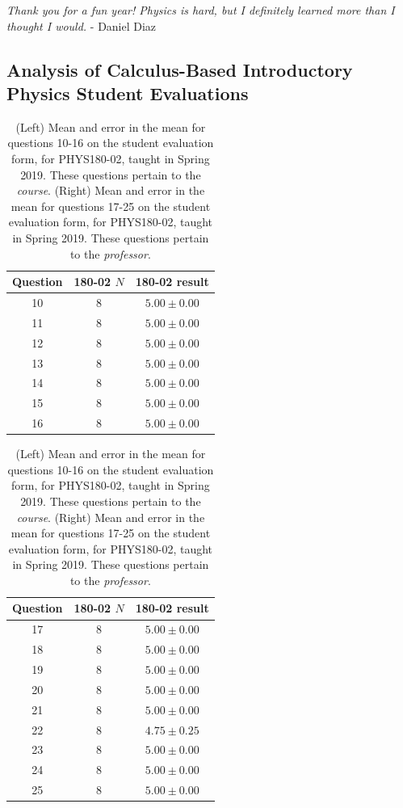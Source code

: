 \documentclass[../../main.tex]{subfiles}
\begin{document}
\textit{Thank you for a fun year!  Physics is hard, but I definitely learned more than I thought I would.} - Daniel Diaz \\ \hspace{0.1cm}

\subsection{Analysis of Calculus-Based Introductory Physics Student Evaluations}

\begin{table}[ht]
\small
\centering
\begin{tabular}{| c | c | c |}
\hline \hline
Question & 180-02 $N$ & 180-02 result \\ \hline
10 & 8 & $5.00\pm 0.00$ \\ \hline
11 & 8 & $5.00\pm 0.00$ \\ \hline
12 & 8 & $5.00\pm 0.00$ \\ \hline
13 & 8 & $5.00\pm 0.00$ \\ \hline
14 & 8 & $5.00\pm 0.00$ \\ \hline
15 & 8 & $5.00\pm 0.00$ \\ \hline
16 & 8 & $5.00\pm 0.00$ \\ \hline
\hline
\end{tabular}
\quad
\begin{tabular}{| c | c | c |}
\hline \hline
Question & 180-02 $N$ & 180-02 result \\ \hline
17 & 8 & $5.00\pm 0.00$ \\ \hline
18 & 8 & $5.00\pm 0.00$ \\ \hline
19 & 8 & $5.00\pm 0.00$ \\ \hline
20 & 8 & $5.00\pm 0.00$ \\ \hline
21 & 8 & $5.00\pm 0.00$ \\ \hline
22 & 8 & $4.75\pm 0.25$ \\ \hline
23 & 8 & $5.00\pm 0.00$ \\ \hline
24 & 8 & $5.00\pm 0.00$ \\ \hline
25 & 8 & $5.00\pm 0.00$ \\ \hline
\hline
\end{tabular}
\caption{\label{tab:courses:intro_eval_3} (Left) Mean and error in the mean for questions 10-16 on the student evaluation form, for PHYS180-02, taught in Spring 2019.  These questions pertain to the \textit{course}.  (Right) Mean and error in the mean for questions 17-25 on the student evaluation form, for PHYS180-02, taught in Spring 2019.  These questions pertain to the \textit{professor}.}
\end{table}
\end{document}
